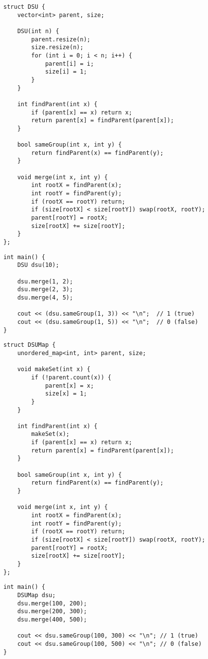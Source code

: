 \documentclass[11pt,a4paper]{article}
\begin{document}
\begin{lstlisting}[caption={DSU with Vector}]
struct DSU {
    vector<int> parent, size;

    DSU(int n) {
        parent.resize(n);
        size.resize(n);
        for (int i = 0; i < n; i++) {
            parent[i] = i;
            size[i] = 1;
        }
    }

    int findParent(int x) {
        if (parent[x] == x) return x;
        return parent[x] = findParent(parent[x]);
    }

    bool sameGroup(int x, int y) {
        return findParent(x) == findParent(y);
    }

    void merge(int x, int y) {
        int rootX = findParent(x);
        int rootY = findParent(y);
        if (rootX == rootY) return;
        if (size[rootX] < size[rootY]) swap(rootX, rootY);
        parent[rootY] = rootX;
        size[rootX] += size[rootY];
    }
};
\end{lstlisting}

\begin{lstlisting}[caption={DSU Example Usage}]
int main() {
    DSU dsu(10);

    dsu.merge(1, 2);
    dsu.merge(2, 3);
    dsu.merge(4, 5);

    cout << (dsu.sameGroup(1, 3)) << "\n";  // 1 (true)
    cout << (dsu.sameGroup(1, 5)) << "\n";  // 0 (false)
}
\end{lstlisting}

\newpage
\begin{lstlisting}[caption={DSU with Unordered Map}]
struct DSUMap {
    unordered_map<int, int> parent, size;

    void makeSet(int x) {
        if (!parent.count(x)) {
            parent[x] = x;
            size[x] = 1;
        }
    }

    int findParent(int x) {
        makeSet(x);
        if (parent[x] == x) return x;
        return parent[x] = findParent(parent[x]);
    }

    bool sameGroup(int x, int y) {
        return findParent(x) == findParent(y);
    }

    void merge(int x, int y) {
        int rootX = findParent(x);
        int rootY = findParent(y);
        if (rootX == rootY) return;
        if (size[rootX] < size[rootY]) swap(rootX, rootY);
        parent[rootY] = rootX;
        size[rootX] += size[rootY];
    }
};
\end{lstlisting}

\begin{lstlisting}[caption={DSU Map Example Usage}]
int main() {
    DSUMap dsu;
    dsu.merge(100, 200);
    dsu.merge(200, 300);
    dsu.merge(400, 500);

    cout << dsu.sameGroup(100, 300) << "\n"; // 1 (true)
    cout << dsu.sameGroup(100, 500) << "\n"; // 0 (false)
}
\end{lstlisting}
\end{document}
